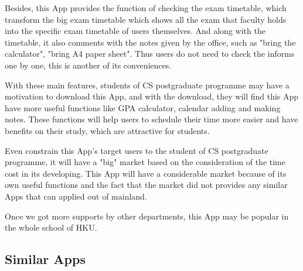 \documentclass{article}
\begin{document}
    Besides, this App provides the function of checking the exam timetable,
    which transform the big exam timetable 
    which shows all the exam that faculty holds into 
    the specific exam timetable of users themselves.
    And along with the timetable, it also comments with the notes
    given by the office, such as "bring the calculator", 
    "bring A4 paper sheet".
    Thus users do not need to check the informs one by one, 
    this is another of its conveniences.

    With these main features, students of CS postgraduate programme
    may have a motivation to download this App, and with the download,
    they will find this App have more useful functions like 
    GPA calculator, calendar adding and making notes.
    These functions will help users to schedule their time more easier
    and have benefits on their study, which are attractive for students.

    Even constrain this App's target users to 
    the student of CS postgraduate programme, 
    it will have a "big" market based on the consideration of
    the time cost in its developing.
    This App will have a considerable market because of 
    its own useful functions and the fact 
    that the market did not provides any similar Apps 
    that can applied out of mainland.

    Once we got more supports by other departments, 
    this App may be popular in the whole school of HKU.





    \subsection{Similar Apps}
\end{document}
